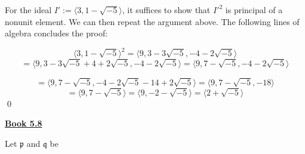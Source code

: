 \documentclass{article}
\newcommand{\new}[1]{
    \vspace{2mm}
    \noindent
    \textbf{
    \underline{#1}}
}
\newcommand{\<}{{
    \langle
}}
\def\>{{
    \rangle
}}
\newcommand{\pideal}{
    {{\mathfrak{p}}}
}
\newcommand{\qideal}{
    {{\mathfrak{q}}}
}
\begin{document}
\vspace{3mm}
For the ideal $I' := \<3, 1-\sqrt{-5}\>$, it suffices 
to show that $I'^2$ is principal of a nonunit element. 
We can then repeat the argument above. The following 
lines of algebra concludes the proof:


\[
    \<3, 1-\sqrt{-5}\>^2 = \<9, 3-3\sqrt{-5}, -4-2\sqrt{-5}\>
\]\[
    = \<9, 3-3\sqrt{-5} +4 + 2\sqrt{-5}, -4-2\sqrt{-5}\> 
    = \<9, 7-\sqrt{-5}, -4-2\sqrt{-5}\> 
\]

\[
    = \<9, 7-\sqrt{-5}, -4-2\sqrt{-5}-14+2\sqrt{-5}\>
    = \<9, 7-\sqrt{-5}, -18\> 
\]
\[
    = \<9, 7-\sqrt{-5}\> = \<9, -2-\sqrt{-5}\>
    = \<2+\sqrt{-5}\>
\]
\qed


\newpage

\new{Book 5.8}
Let $\pideal$ and $\qideal$ be
\end{document}
